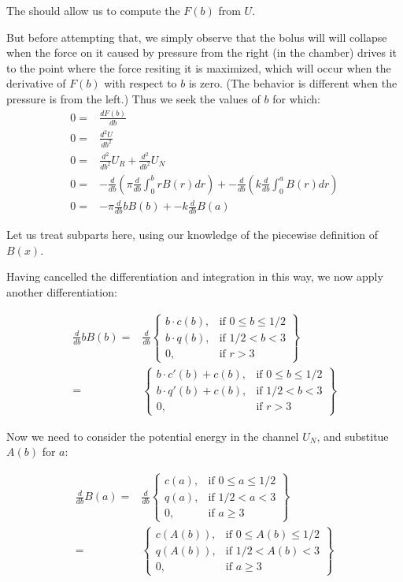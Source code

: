 \documentclass[]{asme2ej}
\begin{document}
The should allow us to compute the $F(b)$ from $U$.


But before attempting that, we simply observe that the bolus will will collapse when the force on
it caused by pressure from the right (in the chamber) drives it to the point where the force
resiting it is maximized, which will occur when the derivative of $F(b)$ with respect to $b$ is
zero. (The behavior is different when the pressure is from the left.)
Thus we seek the values of $b$ for which:
\begin{align}
  0 = & \frac{d F(b)}{db} \\
  0 = & \frac{d^2 U}{db^2}  \\
  0 = & \frac{d^2}{db^2} U_R +  \frac{d^2}{db^2} U_N \\
  0 = & - \frac{d}{db} (\pi \frac{d}{db} \int_0^b r B(r) dr) +  - \frac{d}{db} ( k \frac{d}{db}\int_0^{a} B(r) dr)\\
  0 = & -  \pi  \frac{d}{db} b B(b) +  - k \frac{d}{db} B(a)
  \label{eq:mainPE}
\end{align}

Let us treat subparts here, using our knowledge of the piecewise definition
of $B(x)$.


Having cancelled the differentiation and integration in this way, we now apply another
differentiation:

\begin{align}
   \frac{d}{db} b B(b) = &
  \frac{d}{db}   \left\{
  \begin{array}{lr}
      b \cdot c(b) , & \text{if } 0 \leq b \leq 1/2 \\
      b \cdot q(b) , & \text{if } 1/2 < b < 3 \\
      0  , & \text{if } r > 3
    \end{array}
  \right\} \\
  = &
  \left\{
  \begin{array}{lr}
    b \cdot c'(b) + c(b), & \text{if } 0 \leq b \leq 1/2 \\
      b \cdot q'(b) + c(b), & \text{if } 1/2 < b < 3 \\
      0  , & \text{if } r > 3
    \end{array}
  \right\}
\end{align}

Now we need to consider the potential energy in the channel $U_N$, and substitue
$A(b)$ for $a$:

\begin{align}
  \frac{d}{db} B(a) = &
  \frac{d}{db}
  \left\{
  \begin{array}{lr}
      c(a) , & \text{if } 0 \leq a \leq 1/2 \\
      q(a) , & \text{if } 1/2 < a < 3 \\
      0 , & \text{if } a \geq 3
  \end{array}
  \right\} \\
  = &
  \left\{
  \begin{array}{lr}
      c(A(b)) , & \text{if } 0 \leq A(b) \leq 1/2 \\
      q(A(b)) , & \text{if } 1/2 < A(b) < 3 \\
      0 , & \text{if } a \geq 3
  \end{array}
  \right\}
\end{align}
\end{document}
